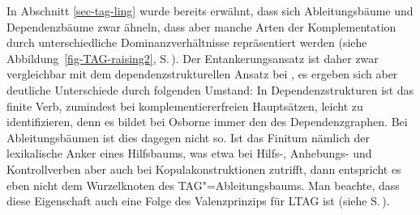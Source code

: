 In Abschnitt \ref{sec-tag-ling} wurde bereits erwähnt, dass sich Ableitungsbäume und Dependenzbäume zwar ähneln, dass aber manche Arten der Komplementation durch unterschiedliche Dominanzverhältnisse repräsentiert werden (siehe Abbildung~\ref{fig-TAG-raising2}, S.\,\pageref{fig-TAG-raising2}). Der Ent\-ankerungs\-ansatz ist daher zwar vergleichbar mit dem dependenzstrukturellen Ansatz bei \cite{Osborne:08}, es ergeben sich aber deutliche Unterschiede durch folgenden Umstand: In Dependenzstrukturen ist das finite Verb, zumindest bei komplementiererfreien Hauptsätzen, leicht zu identifizieren, denn es bildet bei Osborne immer den  des Dependenzgraphen. Bei Ableitungsbäumen ist dies dagegen nicht so. Ist das Finitum nämlich der lexikalische Anker eines Hilfsbaums, was etwa bei Hilfs-, Anhebungs- und Kontrollverben aber auch bei Kopulakonstruktionen zutrifft, dann entspricht es eben nicht dem Wurzelknoten des TAG"=Ableitungsbaums. Man beachte, dass diese Eigenschaft auch eine Folge des Valenzprinzips für LTAG ist (siehe S.\,\pageref{ex-valenzprinzip-tag}).  

